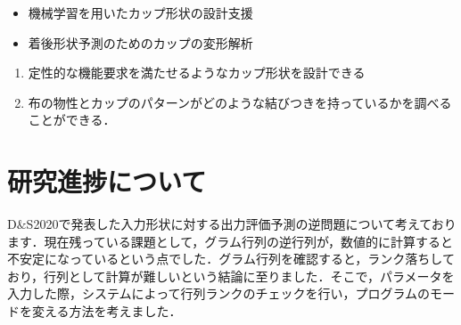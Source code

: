 \documentclass[11pt]{jsarticle}
\begin{document}
	\articleSPRabst
		\begin{itemize}
			\item 機械学習を用いたカップ形状の設計支援
			\item 着後形状予測のためのカップの変形解析
		\end{itemize}
		
		
	\articleSPRobj
		\begin{enumerate}
			\item 定性的な機能要求を満たせるようなカップ形状を設計できる
			\item 布の物性とカップのパターンがどのような結びつきを持っているかを調べることができる．
		\end{enumerate}
	\articleSPRitemsone
		
		\tableofcontents
		
		
	\articleSPRitemstwo
	\renewcommand{\labelitemi}{$\blacktriangledown$}
	\newcommand{\argmax}{\mathop{\rm arg~max}\limits}
	\newcommand{\argmin}{\mathop{\rm arg~min}\limits}
	\newcommand{\Ker}{{\rm Ker}}
	\newcommand{\rank}{{\rm rank}}
	\section{研究進捗について}
		D$\&$S2020で発表した入力形状に対する出力評価予測の逆問題について考えております．現在残っている課題として，グラム行列の逆行列が，数値的に計算すると不安定になっているという点でした．グラム行列を確認すると，ランク落ちしており，行列として計算が難しいという結論に至りました．そこで，パラメータを入力した際，システムによって行列ランクのチェックを行い，プログラムのモードを変える方法を考えました．
\end{document}
